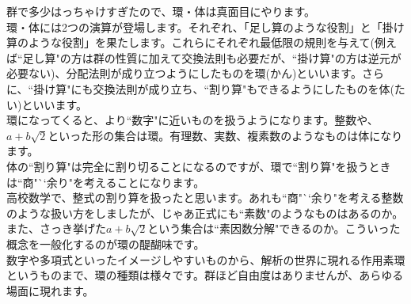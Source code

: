 
群で多少はっちゃけすぎたので、環・体は真面目にやります。\\
環・体には2つの演算が登場します。それぞれ、「足し算のような役割」と「掛け算のような役割」を果たします。これらにそれぞれ最低限の規則を与えて(例えば``足し算"の方は群の性質に加えて交換法則も必要だが、``掛け算"の方は逆元が必要ない)、分配法則が成り立つようにしたものを環(かん)といいます。さらに、``掛け算"にも交換法則が成り立ち、``割り算"もできるようにしたものを体(たい)といいます。\\
環になってくると、より``数字"に近いものを扱うようになります。整数や、$a + b\sqrt{2}$といった形の集合は環。有理数、実数、複素数のようなものは体になります。\\


体の``割り算"は完全に割り切ることになるのですが、環で``割り算"を扱うときは``商"``余り"を考えることになります。\\
高校数学で、整式の割り算を扱ったと思います。あれも``商"``余り"を考える整数のような扱い方をしましたが、じゃあ正式にも``素数"のようなものはあるのか。また、さっき挙げた$a + b\sqrt{2}$という集合は``素因数分解"できるのか。こういった概念を一般化するのが環の醍醐味です。\\
数字や多項式といったイメージしやすいものから、解析の世界に現れる作用素環というものまで、環の種類は様々です。群ほど自由度はありませんが、あらゆる場面に現れます。

